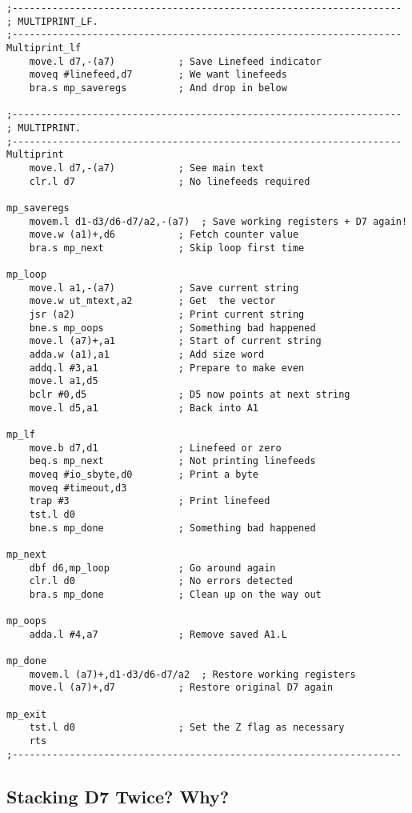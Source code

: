 \begin{lstlisting}[firstnumber=1,caption={Multiprint Utility}]
;--------------------------------------------------------------------
; MULTIPRINT_LF.
;--------------------------------------------------------------------
Multiprint_lf
    move.l d7,-(a7)           ; Save Linefeed indicator
    moveq #linefeed,d7        ; We want linefeeds
    bra.s mp_saveregs         ; And drop in below
       
;--------------------------------------------------------------------
; MULTIPRINT.
;--------------------------------------------------------------------
Multiprint 
    move.l d7,-(a7)           ; See main text
    clr.l d7                  ; No linefeeds required

mp_saveregs
    movem.l d1-d3/d6-d7/a2,-(a7)  ; Save working registers + D7 again!
    move.w (a1)+,d6           ; Fetch counter value
    bra.s mp_next             ; Skip loop first time
       
mp_loop
    move.l a1,-(a7)           ; Save current string
    move.w ut_mtext,a2        ; Get  the vector
    jsr (a2)                  ; Print current string
    bne.s mp_oops             ; Something bad happened
    move.l (a7)+,a1           ; Start of current string
    adda.w (a1),a1            ; Add size word
    addq.l #3,a1              ; Prepare to make even
    move.l a1,d5
    bclr #0,d5                ; D5 now points at next string
    move.l d5,a1              ; Back into A1
       
mp_lf
    move.b d7,d1              ; Linefeed or zero       
    beq.s mp_next             ; Not printing linefeeds
    moveq #io_sbyte,d0        ; Print a byte
    moveq #timeout,d3
    trap #3                   ; Print linefeed
    tst.l d0
    bne.s mp_done             ; Something bad happened
       
mp_next
    dbf d6,mp_loop            ; Go around again
    clr.l d0                  ; No errors detected
    bra.s mp_done             ; Clean up on the way out
       
mp_oops
    adda.l #4,a7              ; Remove saved A1.L
     
mp_done
    movem.l (a7)+,d1-d3/d6-d7/a2  ; Restore working registers
    move.l (a7)+,d7           ; Restore original D7 again

mp_exit
    tst.l d0                  ; Set the Z flag as necessary
    rts
;--------------------------------------------------------------------

\end{lstlisting}

\subsection{Stacking D7 Twice? Why?}


